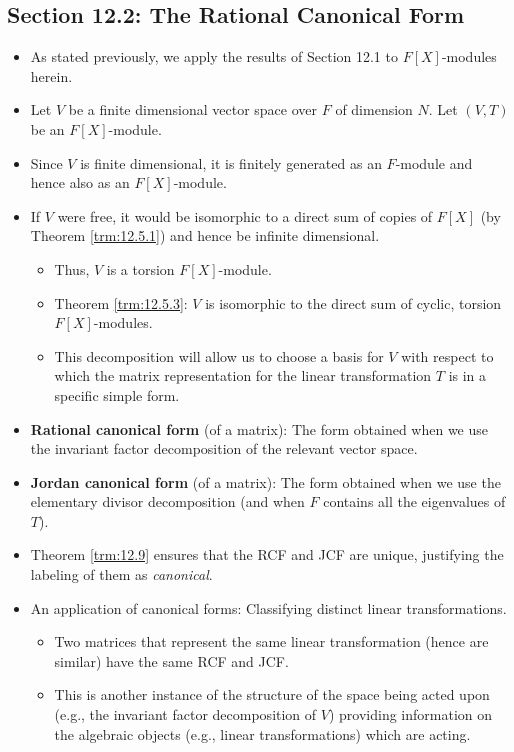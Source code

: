 \documentclass[../notes.tex]{subfiles}
\begin{document}
\subsection*{Section 12.2: The Rational Canonical Form}
\begin{itemize}
    \item {}As stated previously, we apply the results of Section 12.1 to $F[X]$-modules herein.
    \item Let $V$ be a finite dimensional vector space over $F$ of dimension $N$. Let $(V,T)$ be an $F[X]$-module.
    \item Since $V$ is finite dimensional, it is finitely generated as an $F$-module and hence also as an $F[X]$-module.
    \item If $V$ were free, it would be isomorphic to a direct sum of copies of $F[X]$ (by Theorem \ref{trm:12.5.1}) and hence be infinite dimensional.
    \begin{itemize}
        \item Thus, $V$ is a torsion $F[X]$-module.
        \item Theorem \ref{trm:12.5.3}: $V$ is isomorphic to the direct sum of cyclic, torsion $F[X]$-modules.
        \item This decomposition will allow us to choose a basis for $V$ with respect to which the matrix representation for the linear transformation $T$ is in a specific simple form.
    \end{itemize}
    \item \textbf{Rational canonical form} (of a matrix): The form obtained when we use the invariant factor decomposition of the relevant vector space.
    \item \textbf{Jordan canonical form} (of a matrix): The form obtained when we use the elementary divisor decomposition (and when $F$ contains all the eigenvalues of $T$).
    \item Theorem \ref{trm:12.9} ensures that the RCF and JCF are unique, justifying the labeling of them as \emph{canonical}.
    \item An application of canonical forms: Classifying distinct linear transformations.
    \begin{itemize}
        \item Two matrices that represent the same linear transformation (hence are similar) have the same RCF and JCF.
        \item This is another instance of the structure of the space being acted upon (e.g., the invariant factor decomposition of $V$) providing information on the algebraic objects (e.g., linear transformations) which are acting.

\end{itemize}
\end{itemize}
\end{document}
